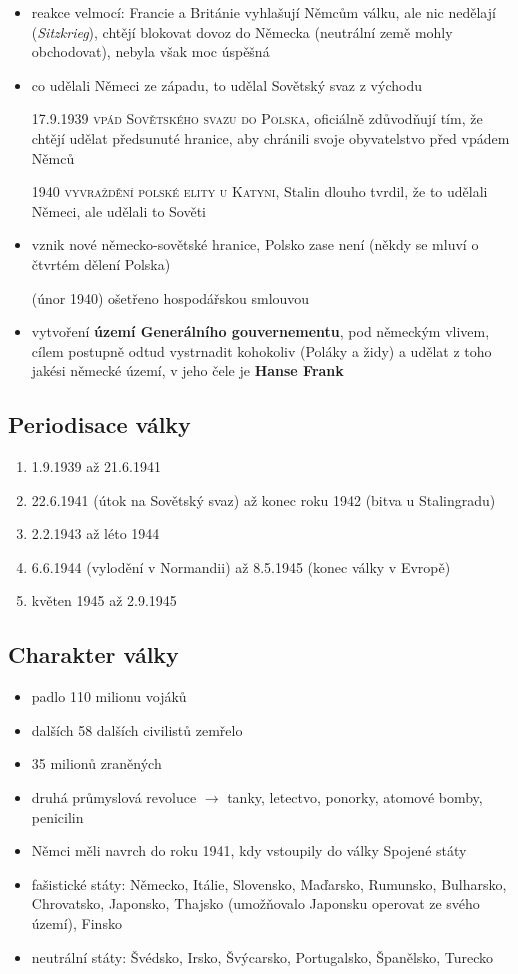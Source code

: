 \documentclass{article}
\begin{document}
\begin{itemize}
    \item reakce velmocí: Francie a Británie vyhlašují Němcům válku, ale nic nedělají (\textit{Sitzkrieg}), chtějí blokovat dovoz do Německa (neutrální země mohly obchodovat), nebyla však moc úspěšná
    \item co udělali Němeci ze západu, to udělal Sovětský svaz z východu
    \item[17.9.1939] \textsc{vpád Sovětského svazu do Polska}, oficiálně zdůvodňují tím, že chtějí udělat předsunuté hranice, aby chránili svoje obyvatelstvo před vpádem Němců
    \item[1940] \textsc{vyvraždění polské elity u Katyni}, Stalin dlouho tvrdil, že to udělali Němeci, ale udělali to Sověti
    \item vznik nové německo-sovětské hranice, Polsko zase není (někdy se mluví o čtvrtém dělení Polska)
    \item[(únor 1940)] ošetřeno hospodářskou smlouvou
    \item vytvoření \textbf{území Generálního gouvernementu}, pod německým vlivem, cílem postupně odtud vystrnadit kohokoliv (Poláky a židy) a udělat z toho jakési německé území, v jeho čele je \textbf{Hanse Frank}
\end{itemize}

\subsection*{Periodisace války}
\begin{enumerate}
    \item 1.9.1939 až 21.6.1941
    \item 22.6.1941 (útok na Sovětský svaz) až konec roku 1942 (bitva u Stalingradu)
    \item 2.2.1943 až léto 1944
    \item 6.6.1944 (vylodění v Normandii) až 8.5.1945 (konec války v Evropě)
    \item květen 1945 až 2.9.1945
\end{enumerate}

\subsection*{Charakter války}
\begin{itemize}
    \item padlo 110 milionu vojáků
    \item dalších 58 dalších civilistů zemřelo
    \item 35 milionů zraněných
    \item druhá průmyslová revoluce $\rightarrow$ tanky, letectvo, ponorky, atomové bomby, penicilin
    \item Němci měli navrch do roku 1941, kdy vstoupily do války Spojené státy
    \item fašistické státy: Německo, Itálie, Slovensko, Maďarsko, Rumunsko, Bulharsko, Chrovatsko, Japonsko, Thajsko (umožňovalo Japonsku operovat ze svého území), Finsko
    \item neutrální státy: Švédsko, Irsko, Švýcarsko, Portugalsko, Španělsko, Turecko
\end{itemize}
\end{document}
